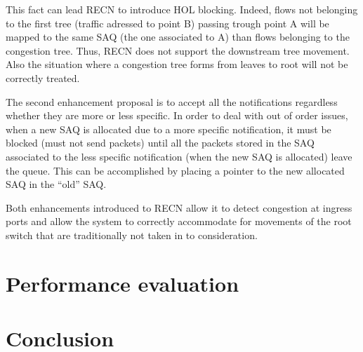 \documentclass[12pt]{article}
\begin{document}
This fact can lead RECN to introduce HOL blocking. Indeed, flows not belonging to the first tree (traffic adressed to point B) passing trough point A will be mapped to the same SAQ (the one associated to A) than flows belonging to the congestion tree. Thus, RECN does not support the downstream tree movement. Also the situation where a congestion tree forms from leaves to root will not be correctly treated.

The second enhancement proposal is to accept all the notifications regardless whether they are more or less specific. In order to deal with out of order issues, when a new SAQ is allocated due to a more specific notification, it must be blocked (must not send packets) until all the packets stored in the SAQ associated to the less specific notification (when the new SAQ is allocated) leave the queue. This can be accomplished by placing a pointer to the new allocated SAQ in the “old” SAQ.

Both enhancements introduced to RECN allow it to detect congestion at ingress ports and allow the system to correctly accommodate for movements of the root switch that are traditionally not taken in to consideration.

\section{Performance evaluation}\label{S:performance}


\section{Conclusion}\label{S:conclusion}


\newpage
\end{document}
